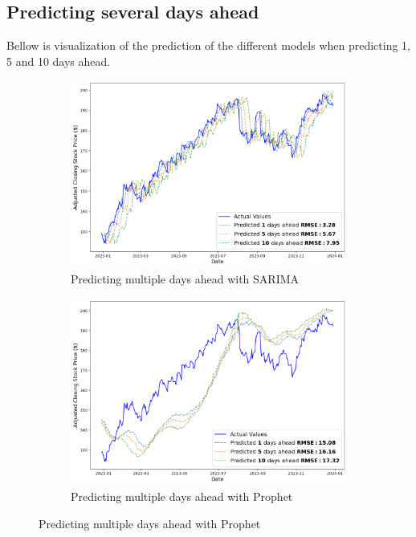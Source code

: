 \documentclass[12pt]{article}
\theoremstyle{definition}
\begin{document}
\subsection{Predicting several days ahead}
Bellow is visualization of the prediction of the different models when predicting 1, 5 and 10 days ahead.

\begin{figure}[H]
  \centering
  
  \begin{subfigure}[b]{0.49\textwidth}
      \centering
      \includegraphics[width=\textwidth]{Images/SARIMA multiple days ahead.png}
      \caption{Predicting multiple days ahead with SARIMA}
      \label{fig:image1}
  \end{subfigure}
  \hfill %
  \begin{subfigure}[b]{0.49\textwidth}
      \centering
      \includegraphics[width=\textwidth]{Images/Prophet multiple days ahead.png}
      \caption{Predicting multiple days ahead with Prophet}
      \label{fig:image2}
  \end{subfigure}
  

\end{figure}
\end{document}
